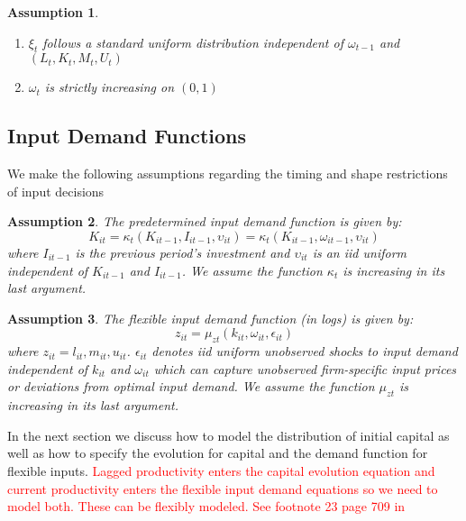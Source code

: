 \documentclass{article}
\newtheorem{assump}{Assumption}[subsection]
\begin{document}
\begin{assump}\label{as2}
~
\begin{enumerate}[label=\alph*)]
\item $\xi_{t}$ follows a standard uniform distribution independent of $\omega_{t-1}$ and $(L_{t}, K_{t}, M_{t}, U_{t})$
\item $\omega_{t}$ is strictly increasing on $(0,1)$
\end{enumerate}
\end{assump}

\subsection{Input Demand Functions}
We make the following assumptions regarding the timing and shape restrictions of input decisions
\begin{assump}{The predetermined input demand function is given by:}\label{as:3}
\begin{equation}\label{capital}
K_{it}=\kappa_{t}(K_{it-1}, I_{it-1}, \upsilon_{it})=\kappa_{t}(K_{it-1}, \omega_{it-1}, \upsilon_{it})
\end{equation}
where $I_{it-1}$ is the previous period's investment and $\upsilon_{it}$ is an iid uniform independent of $K_{it-1}$ and $I_{it-1}$. We assume the function $\kappa_{t}$ is increasing in its last argument.
\end{assump}

\begin{assump}{The flexible input demand function (in logs) is given by:}\label{as:4}
\begin{equation}\label{static}
z_{it}=\mu_{zt}(k_{it}, \omega_{it}, \epsilon_{it})
\end{equation}
where $z_{it}=l_{it}, m_{it}, u_{it}$. $\epsilon_{it}$ denotes iid uniform unobserved shocks  to input demand independent of $k_{it}$ and $\omega_{it}$ which can capture unobserved firm-specific input prices or deviations from optimal input demand. We assume the function $\mu_{zt}$ is increasing in its last argument.
\end{assump}
In the next section we discuss how to model the distribution of initial capital as well as how to specify the evolution for capital and the demand function for flexible inputs. \textcolor{red}{Lagged productivity enters the capital evolution equation and current productivity enters the flexible input demand equations so we need to model both. These can be flexibly modeled. See footnote 23 page 709 in \cite{Arellano2017}}\\
\end{document}
